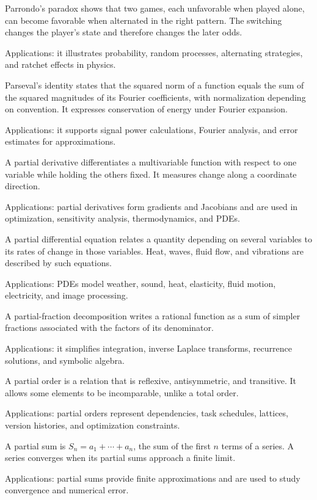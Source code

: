 Parrondo's paradox shows that two games, each unfavorable when played alone, can become favorable when alternated in the right pattern. The switching changes the player's state and therefore changes the later odds. \par\noindent Applications: it illustrates probability, random processes, alternating strategies, and ratchet effects in physics.

Parseval's identity states that the squared norm of a function equals the sum of the squared magnitudes of its Fourier coefficients, with normalization depending on convention. It expresses conservation of energy under Fourier expansion. \par\noindent Applications: it supports signal power calculations, Fourier analysis, and error estimates for approximations.

A partial derivative differentiates a multivariable function with respect to one variable while holding the others fixed. It measures change along a coordinate direction. \par\noindent Applications: partial derivatives form gradients and Jacobians and are used in optimization, sensitivity analysis, thermodynamics, and PDEs.

A partial differential equation relates a quantity depending on several variables to its rates of change in those variables. Heat, waves, fluid flow, and vibrations are described by such equations. \par\noindent Applications: PDEs model weather, sound, heat, elasticity, fluid motion, electricity, and image processing.

A partial-fraction decomposition writes a rational function as a sum of simpler fractions associated with the factors of its denominator. \par\noindent Applications: it simplifies integration, inverse Laplace transforms, recurrence solutions, and symbolic algebra.

A partial order is a relation that is reflexive, antisymmetric, and transitive. It allows some elements to be incomparable, unlike a total order. \par\noindent Applications: partial orders represent dependencies, task schedules, lattices, version histories, and optimization constraints.

A partial sum is $S_n=a_1+\cdots+a_n$, the sum of the first $n$ terms of a series. A series converges when its partial sums approach a finite limit. \par\noindent Applications: partial sums provide finite approximations and are used to study convergence and numerical error.

